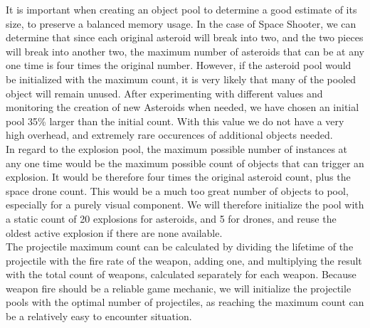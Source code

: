  It is important when creating an object pool to determine a good estimate of its size, to preserve a balanced memory usage. In the case of Space Shooter, we can determine that since each original asteroid will break into two, and the two pieces will break into another two, the maximum number of asteroids that can be at any one time is four times the original number. However, if the asteroid pool would be initialized with the maximum count, it is very likely that many of the pooled object will remain unused. After experimenting with different values and monitoring the creation of new Asteroids when needed, we have chosen an initial pool 35\% larger than the initial count. With this value we do not have a very high overhead, and extremely rare occurences of additional objects needed. \\
 In regard to the explosion pool, the maximum possible number of instances at any one time would be the maximum possible count of objects that can trigger an explosion. It would be therefore four times the original asteroid count, plus the space drone count. This would be a much too great number of objects to pool, especially for a purely visual component. We will therefore initialize the pool with a static count of 20 explosions for asteroids, and 5 for drones, and reuse the oldest active explosion if there are none available. \\
 The projectile maximum count can be calculated by dividing the lifetime of the projectile with the fire rate of the weapon, adding one, and multiplying the result with the total count of weapons, calculated separately for each weapon. Because weapon fire should be a reliable game mechanic, we will initialize the projectile pools with the optimal number of projectiles, as reaching the maximum count can be a relatively easy to encounter situation.
